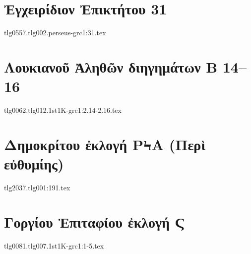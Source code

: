 \documentclass[a4paper,12pt,twoside]{report}
\begin{document}

\chapter[Ἐγχειρίδιον Ἐπικτήτου 31]{\textgreek[variant=ancient]{Ἐγχειρίδιον Ἐπικτήτου} 31}

{tlg0557.tlg002.perseus-grc1:31.tex}


\chapter[Λουκιανοῦ Ἀληθῶν διηγημάτων Β]{\textgreek[variant=ancient]{Λουκιανοῦ Ἀληθῶν διηγημάτων Β} 14–16}

{tlg0062.tlg012.1st1K-grc1:2.14-2.16.tex}


\chapter[Δημοκρίτου ἐκλογή ΡϞΑ]{\textgreek[variant=ancient]{Δημοκρίτου ἐκλογή ΡϞΑ (Περὶ εὐθυμίης)}}

{tlg2037.tlg001:191.tex}




\chapter[Γοργίου Ἐπιτάφιος]{\textgreek[variant=ancient]{Γοργίου Ἐπιταφίου ἐκλογή Ϛ}}

{tlg0081.tlg007.1st1K-grc1:1-5.tex}







\end{document}
